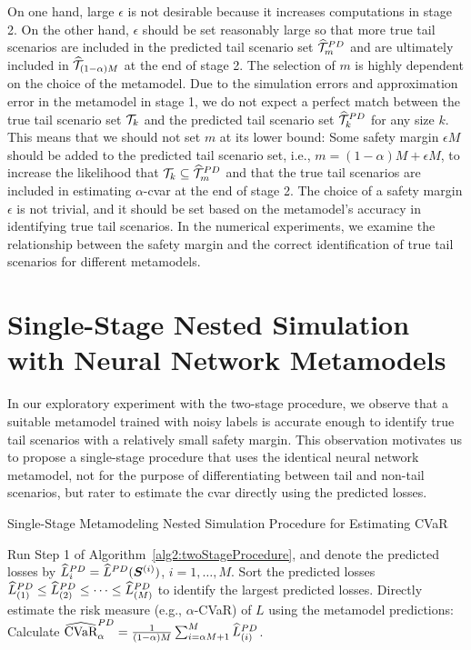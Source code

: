 On one hand, large $\epsilon$ is not desirable because it increases computations in stage 2.
On the other hand, $\epsilon$ should be set reasonably large so that more true tail scenarios are included in the predicted tail scenario set $\widehat{\mathcal{T}}_{m}^{PD}$ and are ultimately included in $\widehat{\mathcal{T}}_{(1-\alpha )M}$ at the end of stage 2.
The selection of $m$ is highly dependent on the choice of the metamodel.
Due to the simulation errors and approximation error in the metamodel in stage 1, we do not expect a perfect match between the true tail scenario set $\mathcal{T}_{k}$ and the predicted tail scenario set $\widehat{\mathcal{T}}_{k}^{PD}$ for any size $k$.
This means that we should not set $m$ at its lower bound: Some safety margin $\epsilon M$ should be added to the predicted tail scenario set, i.e., $m = (1-\alpha )M + \epsilon M$, to increase the likelihood that $\mathcal{T}_{k} \subseteq \widehat{\mathcal{T}}_{m}^{PD}$ and that the true tail scenarios are included in estimating $\alpha$-\gls{cvar} at the end of stage 2.
The choice of a safety margin $\epsilon$ is not trivial, and it should be set based on the metamodel's accuracy in identifying true tail scenarios.
In the numerical experiments, we examine the relationship between the safety margin and the correct identification of true tail scenarios for different metamodels.

\section{Single-Stage Nested Simulation with Neural Network Metamodels} \label{sec2:metamodel1Stage}

In our exploratory experiment with the two-stage procedure, we observe that a suitable metamodel trained with noisy labels is accurate enough to identify true tail scenarios with a relatively small safety margin.
This observation motivates us to propose a single-stage procedure that uses the identical neural network metamodel, not for the purpose of differentiating between tail and non-tail scenarios, but rater to estimate the \gls{cvar} directly using the predicted losses. 

\begin{algorithm}
\caption{Single-Stage Metamodeling Nested Simulation Procedure for Estimating CVaR}
\begin{algorithmic}[1] \label{alg2:oneStageProcedure}
    \STATE Run Step 1 of Algorithm~\ref{alg2:twoStageProcedure}, and denote the predicted losses by
    $\widehat{L}^{PD}_i = \widehat{L}^{PD}(\bm{S}^{(i)})$, $i=1,\ldots,M$.
    \STATE Sort the predicted losses $\widehat{L}^{PD}_{(1)}\leq \widehat{L}^{PD}_{(2)} \leq \cdots\leq \widehat{L}^{PD}_{(M)}$ to identify the largest predicted losses. 
    \STATE Directly estimate the risk measure (e.g., $\alpha$-CVaR) of $L$ using the metamodel predictions: Calculate $\widehat{\mbox{CVaR}}^{PD}_\alpha = \frac{1}{(1-\alpha)M} \sum_{i=\alpha M + 1}^{M}\widehat{L}^{PD}_{(i)}$.
\end{algorithmic}
\end{algorithm}

